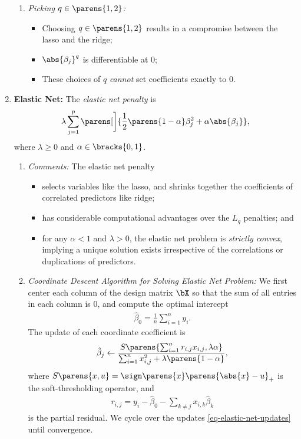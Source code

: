 \documentclass[12pt]{article}
\begin{document}
\begin{enumerate}[label=\textbf{\arabic*.}]
\begin{enumerate}
		\item \textit{Picking $q \in \parens{1, 2}$:} 
		\begin{itemize}
			\item Choosing $q \in \parens{1, 2}$ results in a compromise between the lasso and the ridge; 
			\item $\abs{\beta_j}^q$ is differentiable at $0$; 
			\item These choices of $q$ \textit{cannot} set coefficients exactly to 0. 
		\end{itemize}
	\end{enumerate}
		
	\item \textbf{Elastic Net:} The \textit{elastic net penalty} is 
	\begin{align*}
		\lambda \sum_{j=1}^p \parens[\bigg]{\frac{1}{2} \parens{1 - \alpha} \beta_j^2 + \alpha \abs{\beta_j}}, 
	\end{align*}
	where $\lambda \ge 0$ and $\alpha \in \bracks{0, 1}$. 
	
	\begin{enumerate}
		\item \textit{Comments:} The elastic net penalty
		\begin{itemize}
			\item selects variables like the lasso, and shrinks together the coefficients of correlated predictors like ridge; 
			\item has considerable computational advantages over the $L_q$ penalties; and 
			\item for any $\alpha < 1$ and $ \lambda > 0$, the elastic net problem is \textit{strictly convex}, implying a unique solution exists irrespective of the correlations or duplications of predictors. 
		\end{itemize}
		
		\item \textit{Coordinate Descent Algorithm for Solving Elastic Net Problem:} We first center each column of the design matrix $\bX$ so that the sum of all entries in each column is 0, and compute the optimal intercept 
		\begin{align*}
			\hat{\beta}_0 = \frac{1}{n} \sum_{i=1}^n y_i. 
		\end{align*}
		The update of each coordinate coefficient is 
		\begin{align}\label{eq-elastic-net-updates}
			\hat{\beta}_j \leftarrow \frac{S \parens{\sum_{i=1}^n r_{i, j} x_{i, j}, \lambda \alpha}}{\sum_{i=1}^n x_{i,j}^2 + \lambda \parens{1 - \alpha}}, 
		\end{align}
		where $S \parens{x, u} = \sign \parens{x} \parens{\abs{x} - u}_+$ is the soft-thresholding operator, and 
		\begin{align*}
			r_{i,j} = y_i - \hat{\beta}_0 - \sum_{k \neq j} x_{i,k} \hat{\beta}_k
		\end{align*}
		is the partial residual. We cycle over the updates \eqref{eq-elastic-net-updates} until convergence. 
	\end{enumerate}
	

\end{enumerate}
\end{document}
